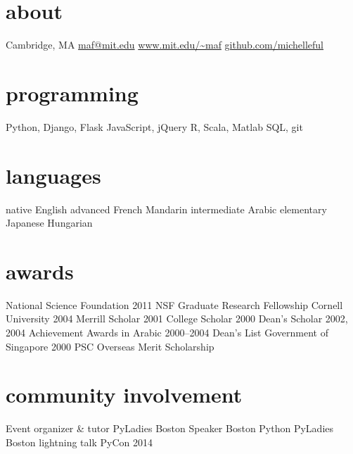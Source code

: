 \documentclass[]{friggeri-cv}
\begin{document}


\begin{aside}
  \section{about}
	Cambridge, MA
    \href{mailto:maf@mit.edu}{maf@mit.edu}
    \href{http://www.mit.edu/~maf}{www.mit.edu/\textasciitilde maf}
    \href{http://github.com/michelleful}{github.com/michelleful}
  \section{programming}
    Python, Django, Flask
    JavaScript, jQuery
	R, Scala, Matlab
	SQL, git
  \section{languages}
	{\footnotesize{}native} English
	{\footnotesize{}advanced} French
	         Mandarin
	{\footnotesize{}intermediate} Arabic
	{\footnotesize{}elementary} Japanese
	           Hungarian
  \section{awards}
    {\footnotesize{}National Science Foundation}
    {\footnotesize{}2011} NSF Graduate Research Fellowship
    {\footnotesize{}Cornell University} 
    {\footnotesize{}2004} Merrill Scholar
    {\footnotesize{}2001} College Scholar
    {\footnotesize{}2000} Dean's Scholar
    {\footnotesize{}2002, 2004} Achievement Awards in Arabic
    {\footnotesize{}2000--2004} Dean's List
    {\footnotesize{}Government of Singapore}
    {\footnotesize{}2000} PSC Overseas Merit Scholarship 
  \section{community involvement}
    {\footnotesize{}Event organizer \& tutor}
    PyLadies Boston
    {\footnotesize{}Speaker}
    Boston Python
    PyLadies Boston
    {\footnotesize{}lightning talk }PyCon 2014
\end{aside}
\end{document}
